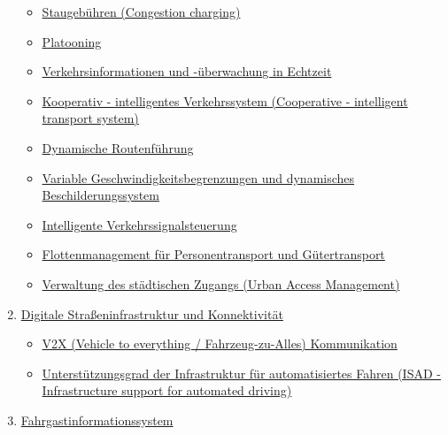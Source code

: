 \documentclass[
]{book}
\providecommand{\tightlist}{%
  \setlength{\itemsep}{0pt}\setlength{\parskip}{0pt}}
\begin{document}
\begin{enumerate}
  \begin{itemize}
  \tightlist
  \item
    \protect\hyperlink{congestion_charging}{Staugebühren (Congestion charging)}\\
  \item
    \protect\hyperlink{platooning}{Platooning}\\
  \item
    \protect\hyperlink{traffic_info_monitoring}{Verkehrsinformationen und -überwachung in Echtzeit}\\
  \item
    \protect\hyperlink{cits}{Kooperativ - intelligentes Verkehrssystem (Cooperative - intelligent transport system)}\\
  \item
    \protect\hyperlink{dynamic_route}{Dynamische Routenführung}\\
  \item
    \protect\hyperlink{variable_speed}{Variable Geschwindigkeitsbegrenzungen und dynamisches Beschilderungssystem}\\
  \item
    \protect\hyperlink{adaptive_traffic_control}{Intelligente Verkehrssignalsteuerung}\\
  \item
    \protect\hyperlink{p_g_fleet_management}{Flottenmanagement für Personentransport und Gütertransport}\\
  \item
    \protect\hyperlink{urban_access}{Verwaltung des städtischen Zugangs (Urban Access Management)}\\
  \end{itemize}
\item
  \protect\hyperlink{digital}{Digitale Straßeninfrastruktur und Konnektivität}

  \begin{itemize}
  \tightlist
  \item
    \protect\hyperlink{v2x}{V2X (Vehicle to everything / Fahrzeug-zu-Alles) Kommunikation}\\
  \item
    \protect\hyperlink{infrast_support_level}{Unterstützungsgrad der Infrastruktur für automatisiertes Fahren (ISAD - Infrastructure support for automated driving)}\\
  \end{itemize}
\item
  \protect\hyperlink{passenger}{Fahrgastinformationssystem}


\end{enumerate}
\end{document}
